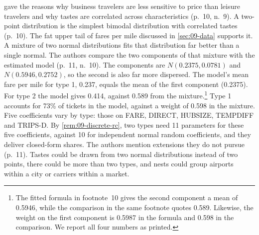  gave the reasons why business travelers are less sensitive to price than
leisure travelers and why tastes are correlated across characteristics (p.~10, n.~9). A two-point
distribution is the simplest
bimodal distribution with correlated tastes (p.~10). The fat upper tail of fares per mile discussed in
\cref{sec:09-data} supports it. A mixture of two normal distributions fits that distribution far better than a
single normal. The authors compare the two components of that mixture with the estimated
model (p.~11, n.~10). The components are $N(0.2375, 0.0781)$ and $N(0.5946, 0.2752)$, so the second is
also far more dispersed. The model's mean fare per mile for type 1, 0.237, equals the mean of the first
component (0.2375). For type 2 the model gives 0.414, against 0.589 from the mixture.\footnote{The fitted
formula in footnote~10 gives the second component a mean of 0.5946, while the comparison in the same
footnote quotes 0.589. Likewise, the weight on the first component is 0.5987 in the formula and 0.598 in
the comparison. We report all four numbers as printed.} Type 1 accounts for 73\% of tickets in the model,
against a weight of 0.598 in the mixture. Five coefficients vary by type: those on FARE, DIRECT, HUBSIZE,
TEMPDIFF and TRIPS-D. By \cref{rem:09-discrete-rc}, two types need 11 parameters for these five
coefficients, against 10 for independent normal random coefficients, and they deliver closed-form shares.
The authors mention extensions they do not pursue (p.~11). Tastes could be drawn from two normal
distributions instead of two points, there could be more than two types, and nests could group airports
within a city or carriers within a market.

